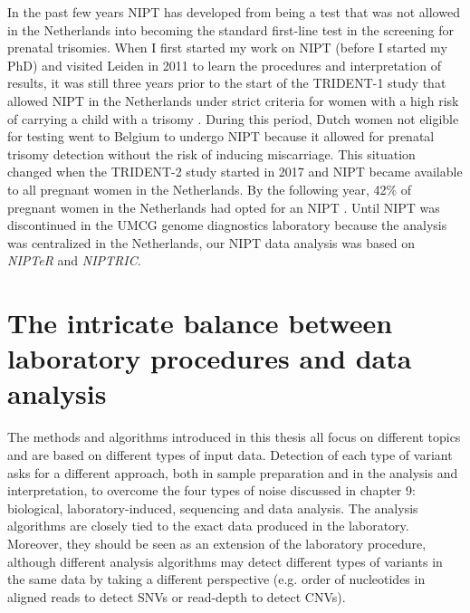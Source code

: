 In the past few years NIPT has developed from being a test that was not allowed in the Netherlands into becoming the standard first-line test in the screening for prenatal trisomies. 
When I first started my work on NIPT (before I started my PhD) and visited Leiden in 2011 to learn the procedures and interpretation of results, it was still three years prior to the start of the TRIDENT-1
study that allowed NIPT in the Netherlands under strict criteria for women with a high risk of carrying a child with a trisomy \cite{MeeroverNIPT_2018}. 
During this period, Dutch women not eligible for testing went to Belgium to undergo NIPT \cite{Visser_2014} because it allowed for prenatal trisomy detection without the risk of inducing miscarriage. 
This situation changed when the TRIDENT-2 study started in 2017 and NIPT became available to all pregnant women in the Netherlands. 
By the following year, 42\% of pregnant women in the Netherlands had opted for an NIPT \cite{niptconsortium_2018}. 
Until NIPT was discontinued in the UMCG genome diagnostics laboratory because the analysis was centralized in the Netherlands, our NIPT data analysis was based on \textsl{NIPTeR} and \textsl{NIPTRIC}.

\section[Balancing laboratory procedures and data analysis]{The intricate balance between laboratory \newline procedures and data analysis}\label{Balance}
The methods and algorithms introduced in this thesis all focus on different topics and are based on different types of input data. 
Detection of each type of variant asks for a different approach, both in sample preparation and in the analysis and interpretation, to overcome the four types of noise 
discussed in chapter 9: biological, laboratory-induced, sequencing and data analysis. 
The analysis algorithms are closely tied to the exact data produced in the laboratory. 
Moreover, they should be seen as an extension of the laboratory procedure, although different analysis algorithms may detect different types of variants in the same data by taking a different perspective (e.g. order of
nucleotides in aligned reads to detect SNVs or read-depth to detect CNVs). 


